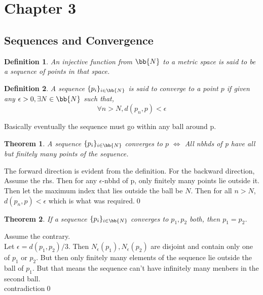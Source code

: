 \documentclass{myclass}
\newtheorem*{definition}{Definition}
\newtheorem*{theorem}{Theorem}
\begin{document}
\section*{Chapter 3}

\subsection{Sequences and Convergence}

\begin{definition}
    An injective function from $\bb{N}$ to a metric space is said to be a 
    sequence of points in that space.
\end{definition}

\begin{definition}
    A sequence $\{p_i\}_{i\in\bb{N}}$ is said to converge to a point $p$ if given any
    $\epsilon>0,\exists N\in\bb{N}$ such that,$$\forall n>N, d(p_n,p)<\epsilon$$
\end{definition}

\begin{remark}
    Basically eventually the sequence must go within any ball around p.
\end{remark}

\begin{theorem}
    A sequence $\{p_i\}_{i\in\bb{N}}$ converges to $p$ $\iff$ All nbhds of p have all but finitely many points of the sequence.
\end{theorem}
\begin{prf}
    The forward direction is evident from the definition. For the backward direction, Assume the rhs.
    Then for any $\epsilon$-nbhd of p, only finitely many points lie outside it. Then let the maximum index that lies outside the ball be $N$.
    Then for all $n>N$,$d(p_n,p)<\epsilon$ which is what was required.\qed
\end{prf}

\begin{theorem}
    If a sequence $\{p_i\}_{i\in\bb{N}}$ converges to $p_1,p_2$ both, then $p_1=p_2$.
\end{theorem}
\begin{prf}
    Assume the contrary.\\
    Let $\epsilon=d(p_1,p_2)/3$. Then $N_\epsilon(p_1),N_\epsilon(p_2)$ are disjoint and contain only one of $p_1$ or $p_2$.
    But then only finitely many elements of the sequence lie outside the ball of $p_1$. But that means the sequence can't have infinitely many menbers in the second ball.\\
    contradiction\qed
\end{prf}
\end{document}
